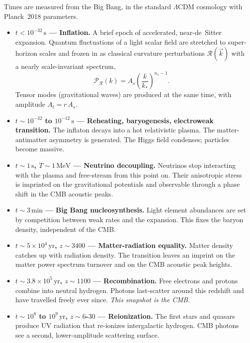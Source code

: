 Times are measured from the Big Bang, in the standard $\Lambda$CDM cosmology with Planck~2018 parameters.

\begin{itemize}[leftmargin=*]
  \item \textbf{$t < 10^{-32}\,\mathrm{s}$ — Inflation.}
    A brief epoch of accelerated, near-de~Sitter expansion. Quantum fluctuations of a light scalar field are stretched to super-horizon scales and frozen in as classical curvature perturbations $\mathcal{R}(\vec{k})$ with a nearly scale-invariant spectrum,
    \[
      \mathcal{P}_{\mathcal{R}}(k) = A_s \left(\frac{k}{k_*}\right)^{n_s - 1}.
    \]
    Tensor modes (gravitational waves) are produced at the same time, with amplitude $A_t = r\, A_s$.

  \item \textbf{$t \sim 10^{-32}$ to $10^{-12}\,\mathrm{s}$ — Reheating, baryogenesis, electroweak transition.}
    The inflaton decays into a hot relativistic plasma. The matter-antimatter asymmetry is generated. The Higgs field condenses; particles become massive.

  \item \textbf{$t \sim 1\,\mathrm{s}$, $T \sim 1\,\mathrm{MeV}$ — Neutrino decoupling.}
    Neutrinos stop interacting with the plasma and free-stream from this point on. Their anisotropic stress is imprinted on the gravitational potentials and observable through a phase shift in the CMB acoustic peaks.

  \item \textbf{$t \sim 3\,\mathrm{min}$ — Big Bang nucleosynthesis.}
    Light element abundances are set by competition between weak rates and the expansion. This fixes the baryon density, independent of the CMB.

  \item \textbf{$t \sim 5\times 10^{4}\,\mathrm{yr}$, $z \sim 3400$ — Matter-radiation equality.}
    Matter density catches up with radiation density. The transition leaves an imprint on the matter power spectrum turnover and on the CMB acoustic peak heights.

  \item \textbf{$t \sim 3.8 \times 10^{5}\,\mathrm{yr}$, $z \sim 1100$ — Recombination.}
    Free electrons and protons combine into neutral hydrogen. Photons last-scatter around this redshift and have travelled freely ever since. \emph{This snapshot is the CMB.}

  \item \textbf{$t \sim 10^{8}$ to $10^{9}\,\mathrm{yr}$, $z \sim 6$-$30$ — Reionization.}
    The first stars and quasars produce UV radiation that re-ionizes intergalactic hydrogen. CMB photons see a second, lower-amplitude scattering surface.


\end{itemize}
